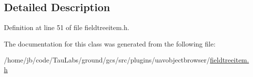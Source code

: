 \subsection{\-Detailed \-Description}


\-Definition at line 51 of file fieldtreeitem.\-h.



\-The documentation for this class was generated from the following file\-:\begin{DoxyCompactItemize}
\item 
/home/jb/code/\-Tau\-Labs/ground/gcs/src/plugins/uavobjectbrowser/\hyperlink{fieldtreeitem_8h}{fieldtreeitem.\-h}\end{DoxyCompactItemize}
